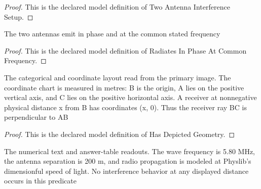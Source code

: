 \begin{proof}
  This is the declared model definition of Two Antenna Interference Setup.
\end{proof}
\begin{definition}
  \label{def:physics:phyx-mini-0117:phyxminiproblems-problemphyxmini0117-radiatesinphaseatcommonfrequency}
  The two antennas emit in phase and at the common stated frequency
\end{definition}
\begin{proof}
  This is the declared model definition of Radiates In Phase At Common Frequency.
\end{proof}
\begin{definition}
  \label{def:physics:phyx-mini-0117:phyxminiproblems-problemphyxmini0117-hasdepictedgeometry}
  The categorical and coordinate layout read from the primary image. The coordinate chart is measured in metres: B is the origin, A lies on the positive vertical axis, and C lies on the positive horizontal axis. A receiver at nonnegative physical distance x from B has coordinates (x, 0). Thus the receiver ray BC is perpendicular to AB
\end{definition}
\begin{proof}
  This is the declared model definition of Has Depicted Geometry.
\end{proof}
\begin{definition}
  \label{def:physics:phyx-mini-0117:phyxminiproblems-problemphyxmini0117-hasstatedreadouts}
  The numerical text and answer-table readouts. The wave frequency is 5.80 MHz, the antenna separation is 200 m, and radio propagation is modeled at Physlib's dimensionful speed of light. No interference behavior at any displayed distance occurs in this predicate
\end{definition}
